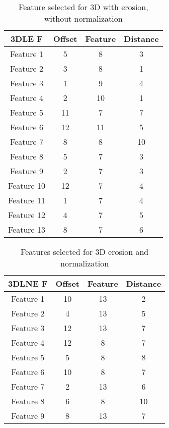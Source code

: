 \begin{table}[H]
  \centering
    \begin{tabular}{|c|c|c|c|}
     \hline
            3DLE F & Offset & Feature & Distance \\ \hline
          Feature 1& 5     & 8     & 3 \\ \hline
          Feature 2& 3     & 8     & 1 \\ \hline
          Feature 3& 1     & 9     & 4 \\ \hline
          Feature 4& 2     & 10    & 1 \\ \hline
          Feature 5& 11    & 7     & 7 \\ \hline
          Feature 6& 12    & 11    & 5 \\ \hline
          Feature 7& 8     & 8     & 10 \\ \hline
          Feature 8& 5     & 7     & 3 \\ \hline
          Feature 9& 2     & 7     & 3 \\ \hline
          Feature 10& 12    & 7     & 4 \\ \hline
          Feature 11& 1     & 7     & 4 \\ \hline
          Feature 12& 4     & 7     & 5 \\ \hline
          Feature 13& 8     & 7     & 6 \\ \hline
    \end{tabular}%
  \caption{Feature selected for 3D with erosion, without normalization}\label{tab:3DEnorm}%
\end{table}%


\begin{table}[H]
  \centering
    \begin{tabular}{|c|c|c|c|}
     \hline
    3DLNE F & Offset & Feature & Distance \\ \hline
        Feature 1& 10    & 13    & 2 \\ \hline
        Feature 2& 4     & 13    & 5 \\ \hline
        Feature 3& 12    & 13    & 7 \\ \hline
        Feature 4& 12    & 8     & 7 \\ \hline
        Feature 5& 5     & 8     & 8 \\ \hline
        Feature 6& 10    & 8     & 7 \\ \hline
        Feature 7& 2     & 13    & 6 \\ \hline
        Feature 8& 6     & 8     & 10 \\ \hline
        Feature 9& 8     & 13    & 7 \\ \hline
    \end{tabular}%
  \caption{Features selected for 3D erosion and normalization}\label{tab:3DLNE}%
\end{table}%

